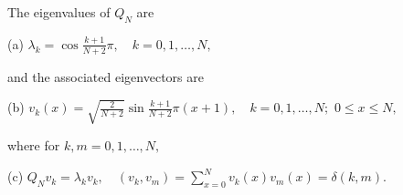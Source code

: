 The eigenvalues of $Q_N$ are

(a) $\lambda_k = \cos \frac{k+1}{N+2} \pi, \quad k = 0, 1, \ldots, N,$

and the associated eigenvectors are

(b) $v_k(x) = \sqrt{\frac{2}{N+2}} \sin \frac{k+1}{N+2} \pi(x+1), \quad k = 0, 1, \ldots, N;$
$0 \leq x \leq N,$

where for $k,m = 0, 1, \ldots, N,$

(c) $Q_N v_k = \lambda_k v_k, \quad (v_k, v_m) = \sum_{x=0}^{N} v_k(x) v_m(x) = \delta(k,m).$